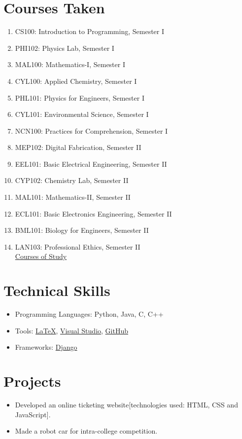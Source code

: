 \documentclass{article}
\begin{document}
	\section*{Courses Taken}
	\begin{enumerate}
		\item CS100: Introduction to Programming, Semester I 
		\item PHI102: Physics Lab, Semester I 
		\item MAL100: Mathematics-I, Semester I 
		\item CYL100: Applied Chemistry, Semester I 
		\item PHL101: Physics for Engineers, Semester I 
		\item CYL101: Environmental Science, Semester I 
		\item NCN100: Practices for Comprehension, Semester I 
		\item MEP102: Digital Fabrication, Semester II
		\item EEL101: Basic Electrical Engineering, Semester II
		\item CYP102: Chemistry Lab, Semester II
		\item MAL101: Mathematics-II, Semester II
		\item ECL101: Basic Electronics Engineering, Semester II
		\item BML101: Biology for Engineers, Semester II
		\item LAN103: Professional Ethics, Semester II\\
		
		\href{https://www.iitbhilai.ac.in/index.php?pid=new_schedule_programs}{Courses of Study}
	\end{enumerate}
	
	\section*{Technical Skills}
	\begin{itemize}
		\item Programming Languages: Python, Java, C, C++
		\item Tools: \href{https://www.latex-project.org}{LaTeX}, \href{https://www.visualstudio.com}{Visual Studio}, \href{https://www.github.com}{GitHub}
		\item Frameworks: \href{https://www.djangoproject.com/}{Django}
	\end{itemize}
	
	\section*{Projects}
	\begin{itemize}
		\item Developed an online ticketing website[technologies used: HTML, CSS and JavaScript].
		\item Made a robot car for intra-college competition.
	\end{itemize}
	
\end{document}
